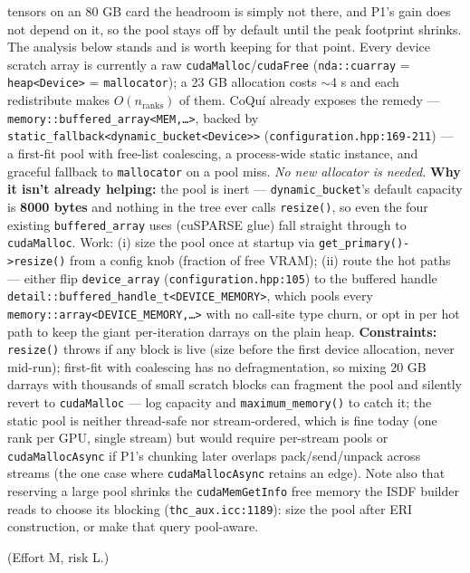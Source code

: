 \documentclass[11pt]{article}
\begin{document}
\begin{description}[leftmargin=1.6em,style=nextline]
tensors on an 80 GB card the headroom is simply not there, and P1's gain does not depend
on it, so the pool stays off by default until the peak footprint shrinks. The analysis
below stands and is worth keeping for that point.
Every device scratch array is currently a raw \texttt{cudaMalloc}/\texttt{cudaFree}
(\texttt{nda::cuarray} = \texttt{heap<Device>} = \texttt{mallocator}); a 23 GB allocation
costs $\sim$4 s and each redistribute makes $O(n_{\mathrm{ranks}})$ of them. CoQu\'i
already exposes the remedy --- \texttt{memory::buffered\_array<MEM,\ldots>}, backed by
\texttt{static\_fallback<dynamic\_bucket<Device>>} (\texttt{configuration.hpp:169-211}) --- a first-fit pool with free-list coalescing, a
process-wide static instance, and graceful fallback to \texttt{mallocator} on a pool
miss. \emph{No new allocator is needed.}
\textbf{Why it isn't already helping:} the pool is inert ---
\texttt{dynamic\_bucket}'s default capacity is \textbf{8000 bytes} and nothing in the
tree ever calls \texttt{resize()}, so even the four existing \texttt{buffered\_array}
uses (cuSPARSE glue) fall straight through to \texttt{cudaMalloc}. Work: (i) size the
pool once at startup via \texttt{get\_primary()->resize()} from a config knob (fraction
of free VRAM); (ii) route the hot paths --- either flip \texttt{device\_array}
(\texttt{configuration.hpp:105}) to the buffered handle
\texttt{detail::}\linebreak[1]\texttt{buffered\_handle\_t<DEVICE\_MEMORY>},
which pools every \texttt{memory::array<DEVICE\_MEMORY,\ldots>} with no call-site type
churn, or opt in per hot path to keep the giant per-iteration darrays on the plain heap.
\textbf{Constraints:} \texttt{resize()} throws if any block is live (size before the
first device allocation, never mid-run); first-fit with coalescing has no
defragmentation, so mixing 20 GB darrays with thousands of small scratch blocks can
fragment the pool and silently revert to \texttt{cudaMalloc} --- log capacity and
\texttt{maximum\_memory()} to catch it; the static pool is neither thread-safe nor
stream-ordered, which is fine today (one rank per GPU, single stream) but would require
per-stream pools or \texttt{cudaMallocAsync} if P1's chunking later overlaps
pack/send/unpack across streams (the one case where \texttt{cudaMallocAsync} retains an
edge). Note also that reserving a large pool shrinks the \texttt{cudaMemGetInfo} free
memory the ISDF builder reads to choose its blocking (\texttt{thc\_aux.icc:1189}): size
the pool after ERI construction, or make that query pool-aware.
\item[P3 --- Device-resident basis transforms. \textcolor{good}{$-$25--30 s/iter.}] (Effort M, risk L.)

\end{description}
\end{document}
